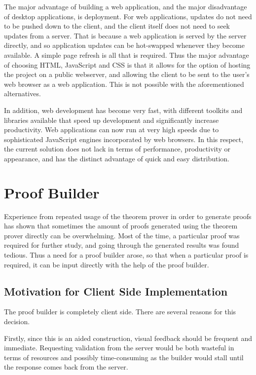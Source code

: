 \documentclass[11pt,twoside,a4paper]{report}
\begin{document}
The major advantage of building a web application, and the major disadvantage of desktop applications, is deployment. For web applications, updates do not need to be pushed down to the client, and the client itself does not need to seek updates from a server. That is because a web application is served by the server directly, and so application updates can be hot-swapped whenever they become available. A simple page refresh is all that is required. Thus the major advantage of choosing HTML, JavaScript and CSS is that it allows for the option of hosting the project on a public webserver, and allowing the client to be sent to the user's web browser as a web application. This is not possible with the aforementioned alternatives.

In addition, web development has become very fast, with different toolkits and libraries available that speed up development and significantly increase productivity. Web applications can now run at very high speeds due to sophisticated JavaScript engines incorporated by web browsers. In this respect, the current solution does not lack in terms of performance, productivity or appearance, and has the distinct advantage of quick and easy distribution.

\chapter{Proof Builder}
\label{chap:proofbuilder}
Experience from repeated usage of the theorem prover in order to generate proofs has shown that sometimes the amount of proofs generated using the theorem prover directly can be overwhelming. Most of the time, a particular proof was required for further study, and going through the generated results was found tedious. Thus a need for a proof builder arose, so that when a particular proof is required, it can be input directly with the help of the proof builder.

\section{Motivation for Client Side Implementation}
The proof builder is completely client side. There are several reasons for this decision. 

Firstly, since this is an aided construction, visual feedback should be frequent and immediate. Requesting validation from the server would be both wasteful in terms of resources and possibly time-consuming as the builder would stall until the response comes back from the server. 
\end{document}
